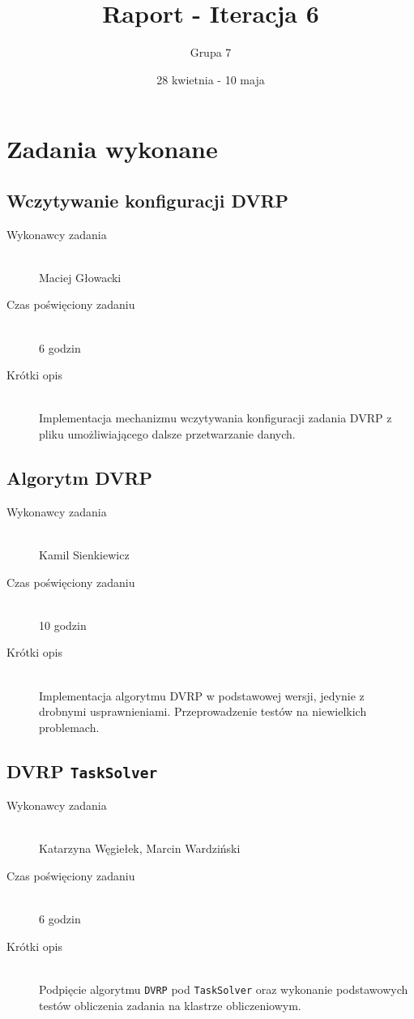 \documentclass[a4paper]{article}
\title{Raport - Iteracja 6}
\date{28 kwietnia - 10 maja}
\author{Grupa 7}
\begin{document}
\maketitle

\section{Zadania wykonane}
\subsection{Wczytywanie konfiguracji DVRP}
\begin{description}
    \item[Wykonawcy zadania] \hfill \\ Maciej Głowacki
    \item[Czas poświęciony zadaniu] \hfill \\ 6 godzin
    \item[Krótki opis] \hfill \\ Implementacja mechanizmu wczytywania konfiguracji zadania DVRP z pliku umożliwiającego dalsze przetwarzanie danych.
\end{description}

\subsection{Algorytm DVRP}
\begin{description}
    \item[Wykonawcy zadania] \hfill \\ Kamil Sienkiewicz
    \item[Czas poświęciony zadaniu] \hfill \\ 10 godzin
    \item[Krótki opis] \hfill \\ Implementacja algorytmu DVRP w podstawowej wersji, jedynie z drobnymi usprawnieniami. Przeprowadzenie testów na niewielkich problemach.
\end{description}

\subsection{DVRP \texttt{TaskSolver}}
\begin{description}
    \item[Wykonawcy zadania] \hfill \\ Katarzyna Węgiełek, Marcin Wardziński
    \item[Czas poświęciony zadaniu] \hfill \\ 6 godzin
    \item[Krótki opis] \hfill \\ Podpięcie algorytmu \texttt{DVRP} pod \texttt{TaskSolver} oraz wykonanie podstawowych testów obliczenia zadania na klastrze obliczeniowym.
\end{description}
   
\end{document}
